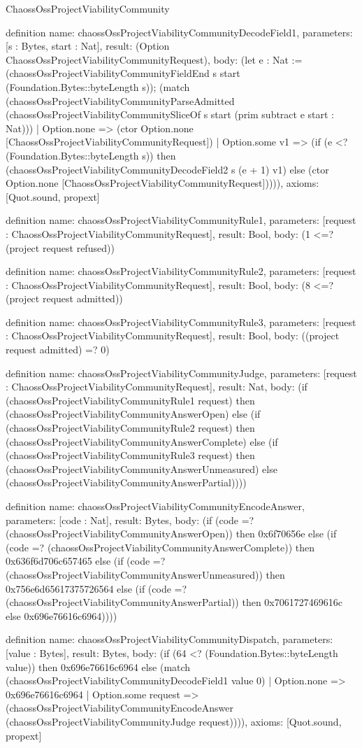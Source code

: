 \begin{lexlean}{ChaossOssProjectViabilityCommunity}
\begin{semanticmodule}
definition{
  name: chaossOssProjectViabilityCommunityDecodeField1,
  parameters: [s : Bytes, start : Nat],
  result: (Option ChaossOssProjectViabilityCommunityRequest),
  body: (let e : Nat := (chaossOssProjectViabilityCommunityFieldEnd s start (Foundation.Bytes::byteLength s)); (match (chaossOssProjectViabilityCommunityParseAdmitted (chaossOssProjectViabilityCommunitySliceOf s start (prim subtract e start : Nat)))
    | Option.none => (ctor Option.none [ChaossOssProjectViabilityCommunityRequest])
    | Option.some v1 => (if (e <? (Foundation.Bytes::byteLength s)) then (chaossOssProjectViabilityCommunityDecodeField2 s (e + 1) v1) else (ctor Option.none [ChaossOssProjectViabilityCommunityRequest])))),
  axioms: [Quot.sound, propext]
}

definition{
  name: chaossOssProjectViabilityCommunityRule1,
  parameters: [request : ChaossOssProjectViabilityCommunityRequest],
  result: Bool,
  body: (1 <=? (project request refused))
}

definition{
  name: chaossOssProjectViabilityCommunityRule2,
  parameters: [request : ChaossOssProjectViabilityCommunityRequest],
  result: Bool,
  body: (8 <=? (project request admitted))
}

definition{
  name: chaossOssProjectViabilityCommunityRule3,
  parameters: [request : ChaossOssProjectViabilityCommunityRequest],
  result: Bool,
  body: ((project request admitted) =? 0)
}

definition{
  name: chaossOssProjectViabilityCommunityJudge,
  parameters: [request : ChaossOssProjectViabilityCommunityRequest],
  result: Nat,
  body: (if (chaossOssProjectViabilityCommunityRule1 request) then (chaossOssProjectViabilityCommunityAnswerOpen) else (if (chaossOssProjectViabilityCommunityRule2 request) then (chaossOssProjectViabilityCommunityAnswerComplete) else (if (chaossOssProjectViabilityCommunityRule3 request) then (chaossOssProjectViabilityCommunityAnswerUnmeasured) else (chaossOssProjectViabilityCommunityAnswerPartial))))
}

definition{
  name: chaossOssProjectViabilityCommunityEncodeAnswer,
  parameters: [code : Nat],
  result: Bytes,
  body: (if (code =? (chaossOssProjectViabilityCommunityAnswerOpen)) then 0x6f70656e else (if (code =? (chaossOssProjectViabilityCommunityAnswerComplete)) then 0x636f6d706c657465 else (if (code =? (chaossOssProjectViabilityCommunityAnswerUnmeasured)) then 0x756e6d65617375726564 else (if (code =? (chaossOssProjectViabilityCommunityAnswerPartial)) then 0x7061727469616c else 0x696e76616c6964))))
}

definition{
  name: chaossOssProjectViabilityCommunityDispatch,
  parameters: [value : Bytes],
  result: Bytes,
  body: (if (64 <? (Foundation.Bytes::byteLength value)) then 0x696e76616c6964 else (match (chaossOssProjectViabilityCommunityDecodeField1 value 0)
    | Option.none => 0x696e76616c6964
    | Option.some request => (chaossOssProjectViabilityCommunityEncodeAnswer (chaossOssProjectViabilityCommunityJudge request)))),
  axioms: [Quot.sound, propext]
}
\end{semanticmodule}
\end{lexlean}

